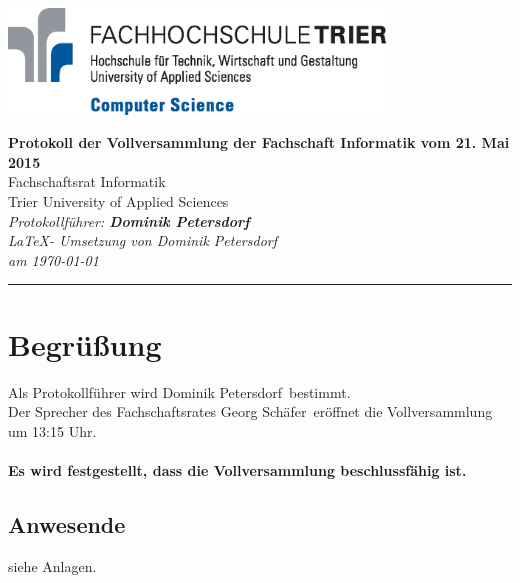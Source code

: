 \documentclass[a4paper, 11pt]{article} %
\newcommand{\protokoller}{Dominik Petersdorf}
\newcommand{\dateOfMeeting}{21. Mai 2015}
\newcommand{\TeXer}{Dominik Petersdorf}
\newcommand{\fsiPresident}{Georg Schäfer}
\begin{document}

\doublespacing
\thispagestyle{empty}

\begin{center}
\includegraphics[width=10.0cm]{../logo_faculty_computer_science.eps}

\vspace*{\fill}
\begin{singlespace}
	{\LARGE \textbf{Protokoll der Vollversammlung der Fachschaft Informatik 
			\singlespacing
			vom \dateOfMeeting}}\\
			Fachschaftsrat Informatik\\
			Trier University of Applied Sciences\\
			\vspace{2.5cm}
			\textit{
			Protokollführer: \textbf{\protokoller} \\
			\LaTeX - Umsetzung von \TeXer\\
			am \today
	}
\end{singlespace}

\vfill
\end{center}

\hspace*{-35cm}
\textcolor{fsi}{\rule{64.9cm}{15pt}}
\pagebreak
 
\setcounter{tocdepth}{2}
\tableofcontents 
\pagebreak

\section{Begrüßung}
Als Protokollführer wird \protokoller~bestimmt.\\
Der Sprecher des Fachschaftsrates \fsiPresident~eröffnet die Vollversammlung um 13:15 Uhr.
\\\\

\textbf{Es wird festgestellt, dass die Vollversammlung beschlussfähig ist.}
\linebreak

\subsection{Anwesende}
siehe Anlagen.
\end{document}
